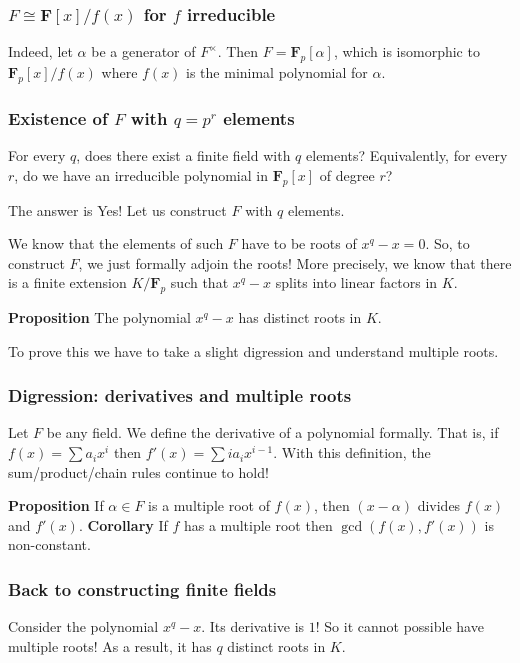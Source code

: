 \documentclass[11pt]{article}
\begin{document}
\subsubsection{\(F \cong \mathbf{F}[x]/f(x)\) for \(f\) irreducible}
\label{sec:orgea08353}
Indeed, let \(\alpha\) be a generator of \(F^{\times}\).
Then \(F = \mathbf{F}_p[\alpha]\), which is isomorphic to \(\mathbf{F}_p[x]/f(x)\) where \(f(x)\) is the minimal polynomial for \(\alpha\).
\subsubsection{Existence of \(F\) with \(q = p^{r}\) elements}
\label{sec:org0868f58}
For every \(q\), does there exist a finite field with \(q\) elements?
Equivalently, for every \(r\), do we have an irreducible polynomial in \(\mathbf{F}_p[x]\) of degree \(r\)?

The answer is Yes!
Let us construct \(F\) with \(q\) elements.

We know that the elements of such \(F\) have to be roots of \(x^q-x = 0\).
So, to construct \(F\), we just formally adjoin the roots!
More precisely, we know that there is a finite extension \(K / \mathbf{F}_p\) such that \(x^q-x\) splits into linear factors in \(K\).

\textbf{\textbf{Proposition}} The polynomial \(x^q-x\) has distinct roots in \(K\).

To prove this we have to take a slight digression and understand multiple roots.
\subsubsection{Digression: derivatives and multiple roots}
\label{sec:org2760430}
Let \(F\) be any field.
We define the derivative of a polynomial formally.
That is, if \(f(x) = \sum a_i x^{i}\) then \(f'(x) = \sum i a_i x^{i-1}.\)
With this definition, the sum/product/chain rules continue to hold!

\textbf{\textbf{Proposition}} If \(\alpha \in F\) is a multiple root of \(f(x)\), then \((x-\alpha)\) divides \(f(x)\) and \(f'(x)\).
\textbf{\textbf{Corollary}} If \(f\) has a multiple root then \(\gcd(f(x), f'(x))\) is non-constant.
\subsubsection{Back to constructing finite fields}
\label{sec:org3d7ad97}
Consider the polynomial \(x^q - x\).
Its derivative is \(1\)!
So it cannot possible have multiple roots!
As a result, it has \(q\) distinct roots in \(K\).
\end{document}
